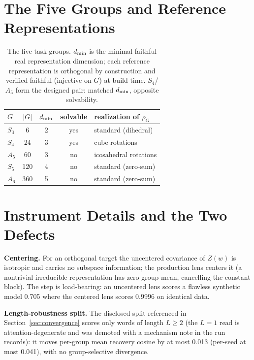 \appendix

\section{The Five Groups and Reference Representations}
\label{app:groups}

\begin{table}[H]
\centering
\small
\begin{tabular}{lcccl}
\toprule
$G$ & $|G|$ & $d_{\min}$ & solvable & realization of $\rho_G$ \\
\midrule
$S_3$ & 6   & 2 & yes & standard (dihedral) \\
$S_4$ & 24  & 3 & yes & cube rotations \\
$A_5$ & 60  & 3 & no  & icosahedral rotations \\
$S_5$ & 120 & 4 & no  & standard (zero-sum) \\
$A_6$ & 360 & 5 & no  & standard (zero-sum) \\
\bottomrule
\end{tabular}
\caption{The five task groups. $d_{\min}$ is the minimal faithful real
representation dimension; each reference representation is orthogonal by
construction and verified faithful (injective on $G$) at build time.
$S_4$/$A_5$ form the designed pair: matched $d_{\min}$, opposite
solvability.}
\label{tab:groups}
\end{table}

\section{Instrument Details and the Two Defects}
\label{app:instrument}

\textbf{Centering.} For an orthogonal target the uncentered covariance
of $Z(w)$ is isotropic and carries no subspace information; the
production lens centers it (a nontrivial irreducible representation has
zero group mean, cancelling the constant block). The step is
load-bearing: an uncentered lens scores a flawless synthetic model 0.705
where the centered lens scores 0.9996 on identical data.

\textbf{Length-robustness split.} The disclosed split referenced in
Section~\ref{sec:convergence} scores only words of length $L \geq 2$
(the $L = 1$ read is attention-degenerate and was demoted with a
mechanism note in the run records): it moves per-group mean recovery
cosine by at most 0.013 (per-seed at most 0.041), with no
group-selective divergence.

